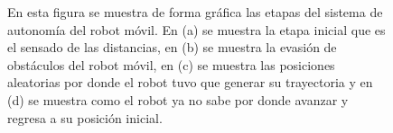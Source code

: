 \begin{figure}[ht!]
     \begin{center}
    \end{center}
  \captionsetup{font=footnotesize}
    \caption{\label{f:SistemaAutonomo} En esta figura se muestra de forma gráfica las etapas del 
    sistema de autonomía del robot móvil. En (a) se muestra la etapa inicial que es el sensado de 
    las distancias, en (b) se muestra la evasión de obstáculos del robot móvil, en (c) se muestra
    las posiciones aleatorias por donde el robot tuvo que generar su trayectoria y en (d) se muestra
    como el robot ya no sabe por donde avanzar y regresa a su posición inicial.}
\end{figure}

